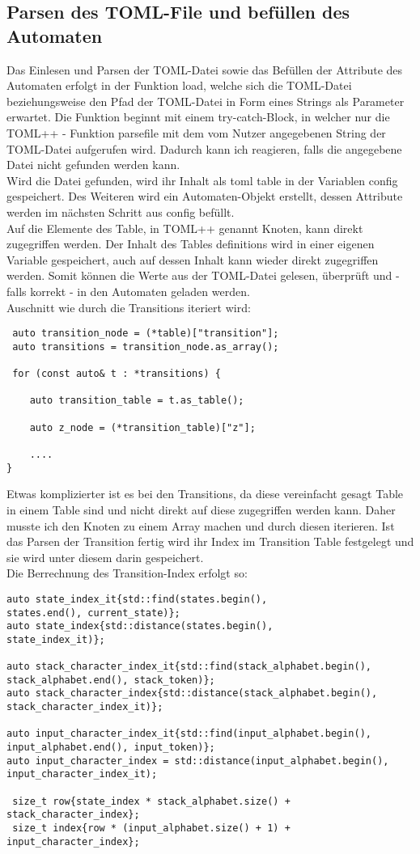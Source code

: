 \documentclass[12pt,a4paper]{article}
\begin{document}
\subsection{Parsen des TOML-File und befüllen des Automaten}
Das Einlesen und Parsen der TOML-Datei sowie das Befüllen der Attribute des Automaten erfolgt in der Funktion load, welche sich die TOML-Datei beziehungsweise den Pfad der TOML-Datei in Form eines Strings als Parameter erwartet. Die Funktion beginnt mit einem try-catch-Block, in welcher nur die TOML++ - Funktion parsefile mit dem vom Nutzer angegebenen String der TOML-Datei aufgerufen wird. Dadurch kann ich reagieren, falls die angegebene Datei nicht gefunden werden kann.
\\
\medskip
Wird die Datei gefunden, wird ihr Inhalt als toml table in der Variablen config gespeichert. Des Weiteren wird ein Automaten-Objekt erstellt, dessen Attribute werden im nächsten Schritt aus config befüllt.
\\
\medskip
Auf die Elemente des Table, in TOML++ genannt Knoten, kann direkt zugegriffen werden. Der Inhalt des Tables definitions wird in einer eigenen Variable gespeichert, auch auf dessen Inhalt kann wieder direkt zugegriffen werden. Somit können die Werte aus der TOML-Datei gelesen, überprüft und - falls korrekt - in den Automaten geladen werden.
\\
Auschnitt wie durch die Transitions iteriert wird:
\begin{lstlisting}
 auto transition_node = (*table)["transition"];
 auto transitions = transition_node.as_array();

 for (const auto& t : *transitions) {

 	auto transition_table = t.as_table();

	auto z_node = (*transition_table)["z"];

	....
}

\end{lstlisting}
\medskip
Etwas komplizierter ist es bei den Transitions, da diese vereinfacht gesagt Table in einem Table sind und nicht direkt auf diese zugegriffen werden kann. Daher musste ich den Knoten zu einem Array machen und durch diesen iterieren. Ist das Parsen der Transition fertig wird ihr Index im Transition Table festgelegt und sie wird unter diesem darin gespeichert.
\\
Die Berrechnung des Transition-Index erfolgt so:
\begin{lstlisting}
auto state_index_it{std::find(states.begin(), 
states.end(), current_state)};
auto state_index{std::distance(states.begin(), 
state_index_it)};

auto stack_character_index_it{std::find(stack_alphabet.begin(), 
stack_alphabet.end(), stack_token)};
auto stack_character_index{std::distance(stack_alphabet.begin(), 
stack_character_index_it)};

auto input_character_index_it{std::find(input_alphabet.begin(), 
input_alphabet.end(), input_token)};
auto input_character_index = std::distance(input_alphabet.begin(), 
input_character_index_it);

 size_t row{state_index * stack_alphabet.size() + 
stack_character_index};
 size_t index{row * (input_alphabet.size() + 1) + 
input_character_index};
\end{lstlisting}
\end{document}
